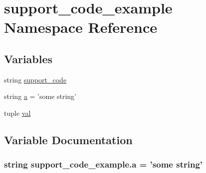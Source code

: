 \hypertarget{namespacesupport__code__example}{}\section{support\+\_\+code\+\_\+example Namespace Reference}
\label{namespacesupport__code__example}
\subsection*{Variables}
\begin{DoxyCompactItemize}
\item 
string \hyperlink{namespacesupport__code__example_aed624a56fcf79a32b749f811d0373720}{support\+\_\+code}
\item 
string \hyperlink{namespacesupport__code__example_af63659ca01a6f5d19db12e81c22c4003}{a} = 'some string'
\item 
tuple \hyperlink{namespacesupport__code__example_a391bf8800a4f981c5a71596f6481b687}{val}
\end{DoxyCompactItemize}


\subsection{Variable Documentation}
\hypertarget{namespacesupport__code__example_af63659ca01a6f5d19db12e81c22c4003}{}
\subsubsection[{a}]{\setlength{\rightskip}{0pt plus 5cm}string support\+\_\+code\+\_\+example.\+a = 'some string'}\label{namespacesupport__code__example_af63659ca01a6f5d19db12e81c22c4003}
\hypertarget{namespacesupport__code__example_aed624a56fcf79a32b749f811d0373720}{}
